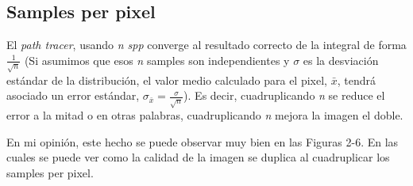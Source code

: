\documentclass{article}
\begin{document}
\subsection{Samples per pixel}

El \textit{path tracer}, usando \textit{n spp} converge al resultado correcto de
la integral de forma \(\frac{1}{\sqrt{n}}\) (Si asumimos que esos \textit{n}
samples son independientes y \(\sigma\) es la desviación estándar de la
distribución, el valor medio calculado para el pixel, \(\bar{x}\), tendrá
asociado un error estándar, \(\sigma_{\bar{x}}=\frac{\sigma}{\sqrt{n}}\)). Es
decir, cuadruplicando \textit{n} se reduce el error a la mitad o en otras
palabras, cuadruplicando \textit{n} mejora la imagen el doble.

En mi opinión, este hecho se puede observar muy bien en las Figuras 2-6. En las
cuales se puede ver como la calidad de la imagen se duplica al cuadruplicar los
samples per pixel.
\end{document}

